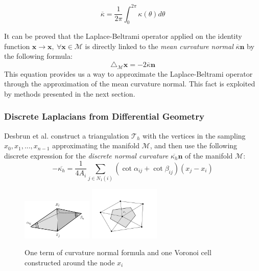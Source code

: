  \begin{equation}\label{eq:mean curvature}
 	\overline \kappa=\frac{1}{2 \pi} \int_{0}^{2 \pi} \kappa(\theta) d \theta
 \end{equation}

It can be proved that the Laplace-Beltrami operator applied on the identity function $\mathbf x \rightarrow \mathbf x, \ \forall \mathbf x\in \mathcal M$ is directly linked to the \textit{mean curvature normal} $\overline{\kappa}\mathbf n$ by the following formula:
\begin{equation}\label{eq:laplacian and curvature}
	\triangle_\mathcal M \mathbf x  = -2\overline{\kappa}\mathbf n
\end{equation}
This equation provides us a way to approximate the Laplace-Beltrami operator through the approximation of the mean curvature normal. This fact is exploited by methods presented in the next section.



\subsubsection{Discrete Laplacians from Differential Geometry}
Desbrun et al. \cite{Desbrun1999} construct a triangulation $\mathcal T_h$ with the vertices in the sampling $x_0, x_1, ..., x_{n-1}$ approximating the manifold $\mathcal M$, and then use the following discrete expression for the \textit{discrete normal curvature} $\overline{\kappa_h} \mathbf{n}$ of the manifold $\mathcal M$:
\begin{equation}\label{eq:curvature normal}
	-\overline{\kappa_h} =\frac{1}{4 A_i} \sum_{j \in N_{1}(i)}\left(\cot \alpha_{ij}+\cot \beta_{ij}\right)\left(x_{j}-x_{i}\right)
\end{equation}


\begin{figure}	
	\begin{center}
		\includegraphics[width=0.3\textwidth]{figs/Chapter3/MyDesbrun.png}
		\includegraphics[width=0.3\textwidth]{figs/Chapter3/Voronoi}
	\end{center}
	\caption{\label{fig:Desbrun}One term of curvature normal formula and one Voronoi cell constructed around the node $x_i$}
\end{figure} 

